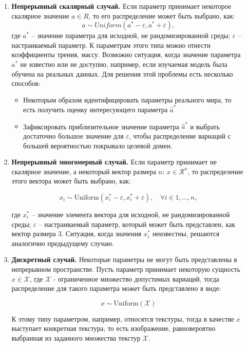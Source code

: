    \begin{enumerate}
        \item \textbf{Непрерывный скалярный случай.} Если параметр принимает некоторое скалярное значение $a \in R$, то его распределение может быть выбрано, как:
        \begin{equation}
            a \sim Uniform(a^* - \varepsilon, a^* + \varepsilon),
        \end{equation}
        где $a^*$ -- значение параметра для исходной, не рандомизированной среды; $\varepsilon$ --  настраиваемый параметр. К параметрам этого типа можно отнести коэффициенты трения, массу. Возможно ситуация, когда значение параметра $a^*$ не известно или не доступно, например, если изучаемая модель была обучена на реальных данных. Для решения этой проблемы есть несколько способов:
            
            \begin{itemize}
                \item Некоторым образом идентифицировать параметры реального мира, то есть получить оценку интересующего параметра $\hat{a}^*$
                \item Зафиксировать приблизительное значение параметра $\hat{a}^*$ и выбрать достаточно большое значение для $\varepsilon$, чтобы распределение вариаций с большей вероятностью покрывало целевой домен.
            \end{itemize}

        \item \textbf{Непрерывный многомерный случай.} Если параметр принимает не скалярное значение, а некоторый вектор размера $n$: $x \in \mathcal{R}^n$, то распределение этого вектора может быть выбрано, как: 

            \begin{equation}
                x_i \sim \mathrm{Uniform}(x_i^* - \varepsilon, x_i^* + \varepsilon), \quad \forall i \in {1, \dots, n},
            \end{equation}

        где $x_i^*$ -- значение элемента вектора для исходной, не рандомизированной среды; $\varepsilon$ --  настраиваемый параметр, который может быть представлен, как вектор размера 3. Ситуация, когда значения $x_i^*$ неизвестны, решаются аналогично предыдущему случаю.

        \item \textbf{Дискретный случай.} Некоторые параметры не могут быть представлены в непрерывном пространстве. Пусть параметр принимает некоторую сущность $x \in \mathcal{X}$, где $\mathcal{X}$ - ограниченное множество допустимых вариаций, тогда распределение для такого параметра может быть представлено в виде:
        
        \begin{equation}
            x \sim \mathrm{Uniform}(\mathcal{X})
        \end{equation}

        К этому типу параметром, например, относятся текстуры, тогда в качестве $x$ выступает конкретная текстура, то есть изображение, равновероятно выбранная из заданного множества текстур $\mathcal{X}$. 
        
    \end{enumerate}

